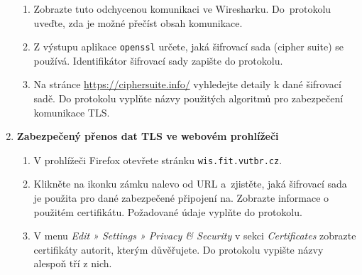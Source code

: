 \documentclass[a4paper,11pt]{article}
\begin{document}
\begin{enumerate}
\begin{enumerate}
      \item Zobrazte tuto odchycenou komunikaci ve Wiresharku.  Do~protokolu uveďte, zda je možné přečíst obsah komunikace. 

      \item Z výstupu aplikace \texttt{openssl} určete, jaká šifrovací sada (cipher suite) se používá. Identifikátor šifrovací sady zapište do protokolu.

      \item Na stránce \url{https://ciphersuite.info/} vyhledejte detaily k dané šifrovací sadě. Do protokolu vyplňte názvy použitých algoritmů pro zabezpečení komunikace TLS.
    \end{enumerate}

  \item {\bf Zabezpečený přenos dat TLS ve webovém prohlížeči}

    \begin{enumerate}
      \item V prohlížeči Firefox otevřete stránku  \verb|wis.fit.vutbr.cz|.
      \item Klikněte na ikonku zámku nalevo od URL a~zjistěte, jaká šifrovací sada je použita pro dané zabezpečené připojení na. Zobrazte informace o použitém certifikátu.
      Požadované údaje vyplňte do protokolu.
      \item V menu \emph{Edit » Settings » Privacy \& Security} v sekci
        \emph{Certificates} zobrazte certifikáty autorit, kterým důvěřujete. Do protokolu vypište názvy alespoň tří z nich.
    \end{enumerate}

\end{enumerate}
\end{document}
